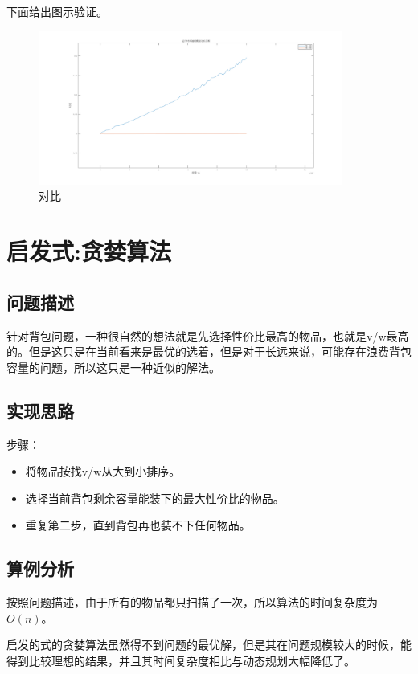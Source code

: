 \documentclass[UTF8]{ctexart}
\begin{document}
下面给出图示验证。
\begin{figure}[H] %
    \centering
    \begin{minipage}[t]{1\textwidth}
        \centering
        \includegraphics[width=10cm]{5.png}
        \caption{对比}
    \end{minipage}
\end{figure}
\section{启发式:贪婪算法}
\subsection{问题描述}
针对背包问题，一种很自然的想法就是先选择性价比最高的物品，也就是v/w最高的。但是这只是在当前看来是最优的选着，但是对于长远来说，可能存在浪费背包容量的问题，所以这只是一种近似的解法。

\subsection{实现思路}
步骤：
\begin{itemize}
    \item 将物品按找v/w从大到小排序。
    \item 选择当前背包剩余容量能装下的最大性价比的物品。
    \item 重复第二步，直到背包再也装不下任何物品。
\end{itemize}

\subsection{算例分析}
按照问题描述，由于所有的物品都只扫描了一次，所以算法的时间复杂度为\(O(n)\)。

启发的式的贪婪算法虽然得不到问题的最优解，但是其在问题规模较大的时候，能得到比较理想的结果，并且其时间复杂度相比与动态规划大幅降低了。
\end{document}
